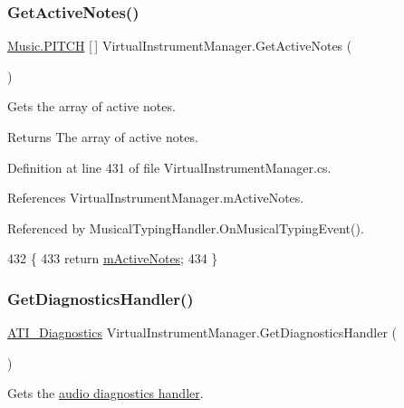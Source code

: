 \subsubsection{\texorpdfstring{Get\+Active\+Notes()}{GetActiveNotes()}}
{\footnotesize\ttfamily \hyperlink{group___music_enums_ga508f69b199ea518f935486c990edac1d}{Music.\+P\+I\+T\+CH} \mbox{[}$\,$\mbox{]} Virtual\+Instrument\+Manager.\+Get\+Active\+Notes (\begin{DoxyParamCaption}{ }\end{DoxyParamCaption})}



Gets the array of active notes. 

\begin{DoxyReturn}{Returns}
The array of active notes. 
\end{DoxyReturn}


Definition at line 431 of file Virtual\+Instrument\+Manager.\+cs.



References Virtual\+Instrument\+Manager.\+m\+Active\+Notes.



Referenced by Musical\+Typing\+Handler.\+On\+Musical\+Typing\+Event().


\begin{DoxyCode}
432     \{
433         \textcolor{keywordflow}{return} \hyperlink{group___v_i_m_priv_ga5cedf9995d59b416412677e6004b659c}{mActiveNotes};
434     \}
\end{DoxyCode}
\mbox{\label{group___v_i_m_pub_func_ga7e60bc3c5464d8f34f0d56def675bcc6}} 
\subsubsection{\texorpdfstring{Get\+Diagnostics\+Handler()}{GetDiagnosticsHandler()}}
{\footnotesize\ttfamily \hyperlink{group___audio_testing_class_a_t_i___diagnostics}{A\+T\+I\+\_\+\+Diagnostics} Virtual\+Instrument\+Manager.\+Get\+Diagnostics\+Handler (\begin{DoxyParamCaption}{ }\end{DoxyParamCaption})}



Gets the \hyperlink{group___audio_testing_class_a_t_i___diagnostics}{audio diagnostics handler}. 


